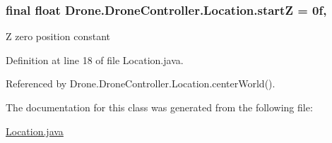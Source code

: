 \subsubsection[{start\+Z}]{\setlength{\rightskip}{0pt plus 5cm}final float Drone.\+Drone\+Controller.\+Location.\+start\+Z = 0f\hspace{0.3cm}{\ttfamily [static]}, {\ttfamily [private]}}\label{class_drone_1_1_drone_controller_1_1_location_a90680b96f92953fa20ff7f91ed83f971}
Z zero position constant 

Definition at line 18 of file Location.\+java.



Referenced by Drone.\+Drone\+Controller.\+Location.\+center\+World().



The documentation for this class was generated from the following file\+:\begin{DoxyCompactItemize}
\item 
\hyperlink{_location_8java}{Location.\+java}\end{DoxyCompactItemize}
